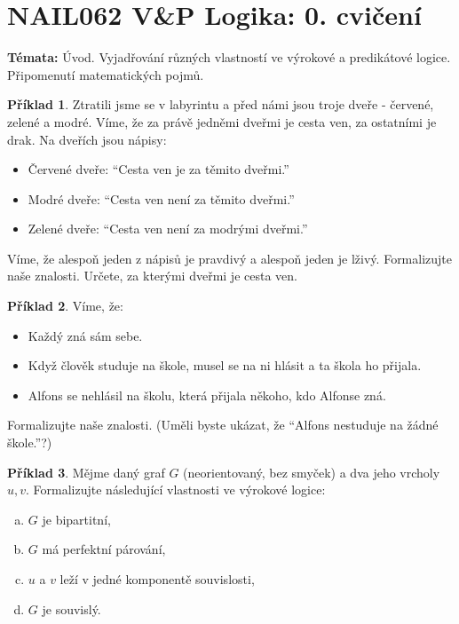 \documentclass[a4paper]{article}
\theoremstyle{definition}
\newtheorem{problem}{Příklad}
\begin{document}
\section*{NAIL062 V\&P Logika: 0. cvičení}


\textbf{Témata:} Úvod. Vyjadřování různých vlastností ve výrokové a predikátové logice. Připomenutí matematických pojmů.


\medskip\begin{problem}
Ztratili jsme se v labyrintu a před námi jsou troje dveře - červené, zelené a modré. Víme, že za právě jedněmi dveřmi je cesta ven, za ostatními je drak. Na dveřích jsou nápisy:
\begin{itemize}
    \item Červené dveře: ``Cesta ven je za těmito dveřmi.''
    \item Modré dveře: ``Cesta ven není za těmito dveřmi.''
    \item Zelené dveře: ``Cesta ven není za modrými dveřmi.'' 
\end{itemize}
Víme, že alespoň jeden z nápisů je pravdivý a alespoň jeden je lživý. Formalizujte naše znalosti. Určete, za kterými dveřmi je cesta ven.
\end{problem}


\medskip\begin{problem} Víme, že:
\begin{itemize}
\item Každý zná sám sebe.
\item Když člověk studuje na škole, musel se na ni hlásit a ta škola ho přijala.
\item Alfons se nehlásil na školu, která přijala někoho, kdo Alfonse zná.
\end{itemize}
Formalizujte naše znalosti. (Uměli byste ukázat, že ``Alfons nestuduje na žádné škole.''?)
\end{problem}


\medskip\begin{problem}
Mějme daný graf $G$ (neorientovaný, bez smyček) a dva jeho vrcholy $u,v$. Formalizujte následující vlastnosti ve výrokové logice:
\begin{enumerate}[(a)]
    \item $G$ je bipartitní,
    \item $G$ má perfektní párování,
    \item $u$ a $v$ leží v jedné komponentě souvislosti,
    \item $G$ je souvislý.
\end{enumerate}
\end{problem}
\end{document}
